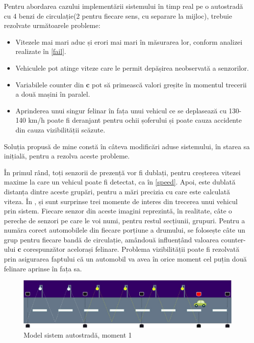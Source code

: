 Pentru abordarea cazului implementării sistemului în timp real pe o autostradă cu 4 benzi de circulație(2 pentru fiecare sens, cu separare la mijloc), trebuie rezolvate următoarele probleme:
\begin{itemize}

\item Vitezele mai mari aduc și erori mai mari în măsurarea lor, conform analizei realizate în \autoref{fail}.

\item Vehiculele pot atinge viteze care le permit depășirea neobservată a senzorilor.

\item Variabilele counter din $\mathbf{c}$ pot să primească valori greșite în momentul trecerii a două mașini în paralel.

\item Aprinderea unui singur felinar în fața unui vehicul ce se deplasează cu 130-140 km/h poate fi deranjant pentru ochii șoferului și poate cauza accidente din cauza vizibilității scăzute.
 
\end{itemize}
Soluția propusă de mine constă în câteva modificări aduse sistemului, în starea sa inițială, pentru a rezolva aceste probleme.

În primul rând, toți senzorii de prezență vor fi dublați, pentru creșterea vitezei maxime la care un vehicul poate fi detectat, ca în \autoref{speed}. Apoi, este dublată distanța dintre aceste grupări, pentru a mări precizia cu care este calculată viteza. În  ,  și  sunt surprinse trei momente de interes din trecerea unui vehicul prin sistem. Fiecare senzor din aceste imagini reprezintă, în realitate, câte o pereche de senzori pe care le voi numi, pentru restul secțiunii, grupuri. Pentru a număra corect automobilele din fiecare porțiune a drumului, se folosește câte un grup pentru fiecare bandă de circulație, amândouă influențând valoarea counter-ului $\mathbf{c}$ corespunzător acelorași felinare. Problema vizibilității poate fi rezolvată prin asigurarea faptului că un automobil va avea în orice moment cel puțin două felinare aprinse în fața sa.
\begin{figure}[!ht]
    \begin{center}
    \includegraphics[width=\linewidth,keepaspectratio]{pics/hw1.jpg}
    \end{center}
    \caption{Model sistem autostradă, moment 1}
    \label{fig:hw1}
\end{figure}

